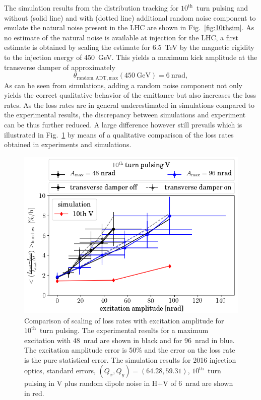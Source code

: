 \documentclass[%
 reprint,
 amsmath,amssymb,
 aps,
prstab,
]{revtex4-1}
\begin{document}
The simulation results from the distribution tracking for $10^{\mathrm{th}}$~turn pulsing and without (solid line) and with (dotted line) additional random noise component to emulate the natural noise present in the LHC are shown in Fig.~\ref{fig:10thsim}. As no estimate of the natural noise is available at injection for the LHC, a first estimate is obtained by scaling the estimate for 6.5~TeV \cite{md1433_noise_top_energy,md_noise_bbLHC} by the magnetic rigidity to the injection energy of 450~GeV. This yields a maximum kick amplitude at the transverse damper of approximately
\begin{equation}
\theta_{\mathrm{random,ADT,max}}(\mathrm{450~GeV}) = 6~\mathrm{nrad},
\end{equation}
As can be seen from simulations, adding a random noise component not only yields the correct qualitative behavior of the emittance but also increases the loss rates. As the loss rates are in general underestimated in simulations compared to the experimental results, the discrepancy between simulations and experiment can be thus further reduced. A large difference however still prevails which is illustrated in Fig.~\ref{fig:10thexploss} by means of a qualitative comparison of the loss rates obtained in experiments and simulations.
\begin{figure}[h]
		\centering
		\includegraphics[width=0.8\linewidth]{2016_scale_amp_10v_ran_lbllong_sim.png}
	\caption{\label{fig:10thexploss} Comparison of scaling of loss rates with excitation amplitude for $10^{\mathrm{th}}$~turn pulsing. The experimental results for a maximum excitation with 48~nrad are shown in black and for 96~nrad in blue. The excitation amplitude error is 50\% and the error on the loss rate is the pure statistical error. The simulation results for 2016 injection optics, standard errors, $(Q_x,Q_y)=(64.28,59.31)$, $10^{\mathrm{th}}$~turn pulsing in V plus random dipole noise in H+V of 6~nrad are shown in red.}
\end{figure}
\end{document}
